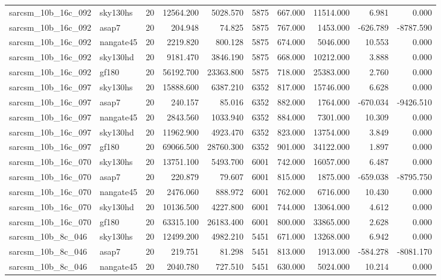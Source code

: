 \begin{tabular}{llrrrrrrrr}
sarcsm\_10b\_16c\_092 & sky130hs & 20 & 12564.200 & 5028.570 & 5875 & 667.000 & 11514.000 & 6.981 & 0.000 \\
sarcsm\_10b\_16c\_092 & asap7 & 20 & 204.948 & 74.825 & 5875 & 767.000 & 1453.000 & -626.789 & -8787.590 \\
sarcsm\_10b\_16c\_092 & nangate45 & 20 & 2219.820 & 800.128 & 5875 & 674.000 & 5046.000 & 10.553 & 0.000 \\
sarcsm\_10b\_16c\_092 & sky130hd & 20 & 9181.470 & 3846.190 & 5875 & 668.000 & 10212.000 & 3.888 & 0.000 \\
sarcsm\_10b\_16c\_092 & gf180 & 20 & 56192.700 & 23363.800 & 5875 & 718.000 & 25383.000 & 2.760 & 0.000 \\
sarcsm\_10b\_16c\_097 & sky130hs & 20 & 15888.600 & 6387.210 & 6352 & 817.000 & 15746.000 & 6.628 & 0.000 \\
sarcsm\_10b\_16c\_097 & asap7 & 20 & 240.157 & 85.016 & 6352 & 882.000 & 1764.000 & -670.034 & -9426.510 \\
sarcsm\_10b\_16c\_097 & nangate45 & 20 & 2843.560 & 1033.940 & 6352 & 884.000 & 7301.000 & 10.309 & 0.000 \\
sarcsm\_10b\_16c\_097 & sky130hd & 20 & 11962.900 & 4923.470 & 6352 & 823.000 & 13754.000 & 3.849 & 0.000 \\
sarcsm\_10b\_16c\_097 & gf180 & 20 & 69066.500 & 28760.300 & 6352 & 901.000 & 34122.000 & 1.897 & 0.000 \\
sarcsm\_10b\_16c\_070 & sky130hs & 20 & 13751.100 & 5493.700 & 6001 & 742.000 & 16057.000 & 6.487 & 0.000 \\
sarcsm\_10b\_16c\_070 & asap7 & 20 & 220.879 & 79.607 & 6001 & 815.000 & 1875.000 & -659.038 & -8795.750 \\
sarcsm\_10b\_16c\_070 & nangate45 & 20 & 2476.060 & 888.972 & 6001 & 762.000 & 6716.000 & 10.430 & 0.000 \\
sarcsm\_10b\_16c\_070 & sky130hd & 20 & 10136.500 & 4227.800 & 6001 & 744.000 & 13064.000 & 4.612 & 0.000 \\
sarcsm\_10b\_16c\_070 & gf180 & 20 & 63315.100 & 26183.400 & 6001 & 800.000 & 33865.000 & 2.628 & 0.000 \\
sarcsm\_10b\_8c\_046 & sky130hs & 20 & 12499.200 & 4982.210 & 5451 & 671.000 & 13268.000 & 6.942 & 0.000 \\
sarcsm\_10b\_8c\_046 & asap7 & 20 & 219.751 & 81.298 & 5451 & 813.000 & 1913.000 & -584.278 & -8081.170 \\
sarcsm\_10b\_8c\_046 & nangate45 & 20 & 2040.780 & 727.510 & 5451 & 630.000 & 5024.000 & 10.214 & 0.000 \\

\end{tabular}
